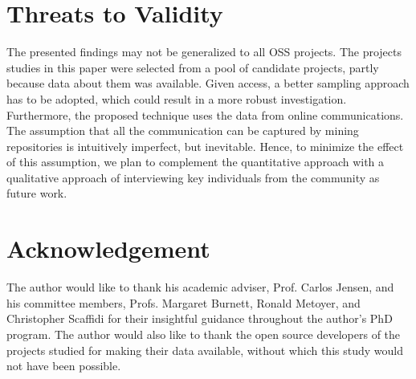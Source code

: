 \documentclass[conference]{IEEEtran}
\begin{document}
\section{Threats to Validity}
The presented findings may not be generalized to all OSS projects. The projects studies in this paper were selected from a pool of candidate projects, partly because data about them was available. Given access, a better sampling approach has to be adopted, which could result in a more robust investigation. Furthermore, the proposed technique uses the data from online communications. The assumption that all the communication can be captured by mining repositories is intuitively imperfect, but inevitable. Hence, to minimize the effect of this assumption, we plan to complement the quantitative approach with a qualitative approach of interviewing key individuals from the community as future work. \\



\section*{Acknowledgement}
\label{acknowledgements}
The author would like to thank his academic adviser, Prof. Carlos Jensen, and his committee members, Profs. Margaret Burnett, Ronald Metoyer, and Christopher Scaffidi for their insightful guidance throughout the author's PhD program.
The author would also like to thank the open source developers of the projects studied for making their data available, without which this study would not have been possible. \\

% 
% 
%

\end{document}
